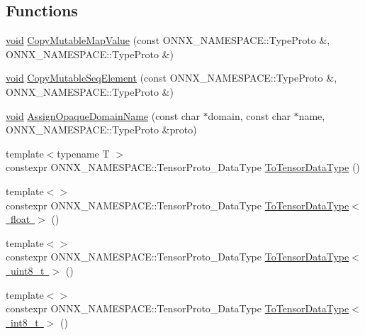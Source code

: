 \subsection*{Functions}
\begin{DoxyCompactItemize}
\item 
\mbox{\hyperlink{mlasi_8h_a88f941d423cb2a819b70a1358982b1a6}{void}} \mbox{\hyperlink{namespaceonnxruntime_1_1data__types__internal_ac1fd254086666e3c4b5a446f675045c2}{Copy\+Mutable\+Map\+Value}} (const O\+N\+N\+X\+\_\+\+N\+A\+M\+E\+S\+P\+A\+C\+E\+::\+Type\+Proto \&, O\+N\+N\+X\+\_\+\+N\+A\+M\+E\+S\+P\+A\+C\+E\+::\+Type\+Proto \&)
\item 
\mbox{\hyperlink{mlasi_8h_a88f941d423cb2a819b70a1358982b1a6}{void}} \mbox{\hyperlink{namespaceonnxruntime_1_1data__types__internal_ae8a105851088c4c54974143738dfd2d5}{Copy\+Mutable\+Seq\+Element}} (const O\+N\+N\+X\+\_\+\+N\+A\+M\+E\+S\+P\+A\+C\+E\+::\+Type\+Proto \&, O\+N\+N\+X\+\_\+\+N\+A\+M\+E\+S\+P\+A\+C\+E\+::\+Type\+Proto \&)
\item 
\mbox{\hyperlink{mlasi_8h_a88f941d423cb2a819b70a1358982b1a6}{void}} \mbox{\hyperlink{namespaceonnxruntime_1_1data__types__internal_a032f5531fe029539cd81b7bb954d3f47}{Assign\+Opaque\+Domain\+Name}} (const char $\ast$domain, const char $\ast$name, O\+N\+N\+X\+\_\+\+N\+A\+M\+E\+S\+P\+A\+C\+E\+::\+Type\+Proto \&proto)
\item 
{\footnotesize template$<$typename T $>$ }\\constexpr O\+N\+N\+X\+\_\+\+N\+A\+M\+E\+S\+P\+A\+C\+E\+::\+Tensor\+Proto\+\_\+\+Data\+Type \mbox{\hyperlink{namespaceonnxruntime_1_1data__types__internal_a083dfe9320ee42949a5284c6989a79d1}{To\+Tensor\+Data\+Type}} ()
\item 
{\footnotesize template$<$$>$ }\\constexpr O\+N\+N\+X\+\_\+\+N\+A\+M\+E\+S\+P\+A\+C\+E\+::\+Tensor\+Proto\+\_\+\+Data\+Type \mbox{\hyperlink{namespaceonnxruntime_1_1data__types__internal_ad28f80ab20f3ff08f92b3821a1cb0403}{To\+Tensor\+Data\+Type$<$ float $>$}} ()
\item 
{\footnotesize template$<$$>$ }\\constexpr O\+N\+N\+X\+\_\+\+N\+A\+M\+E\+S\+P\+A\+C\+E\+::\+Tensor\+Proto\+\_\+\+Data\+Type \mbox{\hyperlink{namespaceonnxruntime_1_1data__types__internal_ad4eb8f9cf6acf01d5824265454b7b223}{To\+Tensor\+Data\+Type$<$ uint8\+\_\+t $>$}} ()
\item 
{\footnotesize template$<$$>$ }\\constexpr O\+N\+N\+X\+\_\+\+N\+A\+M\+E\+S\+P\+A\+C\+E\+::\+Tensor\+Proto\+\_\+\+Data\+Type \mbox{\hyperlink{namespaceonnxruntime_1_1data__types__internal_af9ca8e36fc37d90a20c9a34d84b4aa9f}{To\+Tensor\+Data\+Type$<$ int8\+\_\+t $>$}} ()

\end{DoxyCompactItemize}
